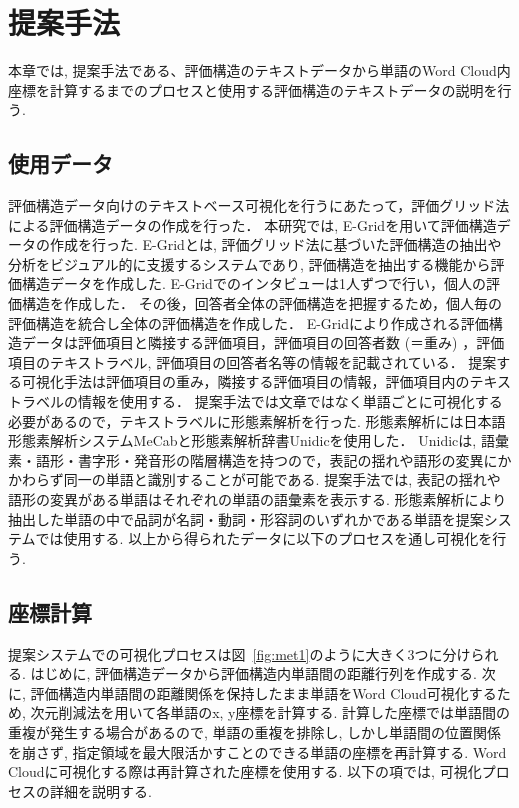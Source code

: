 \documentclass[syuuron]{kuee}
\begin{document}
\chapter{提案手法}
	本章では, 提案手法である、評価構造のテキストデータから単語のWord Cloud内座標を計算するまでのプロセスと使用する評価構造のテキストデータの説明を行う. 
	
	\section{使用データ}
		評価構造データ向けのテキストベース可視化を行うにあたって，評価グリッド法による評価構造データの作成を行った．
		本研究では, E-Gridを用いて評価構造データの作成を行った. 
		E-Gridとは, 評価グリッド法に基づいた評価構造の抽出や分析をビジュアル的に支援するシステムであり, 
		評価構造を抽出する機能から評価構造データを作成した. 
		E-Gridでのインタビューは1人ずつで行い，個人の評価構造を作成した．
		その後，回答者全体の評価構造を把握するため，個人毎の評価構造を統合し全体の評価構造を作成した．
		E-Gridにより作成される評価構造データは評価項目と隣接する評価項目，評価項目の回答者数 (＝重み) ，評価項目のテキストラベル, 評価項目の回答者名等の情報を記載されている．
		提案する可視化手法は評価項目の重み，隣接する評価項目の情報，評価項目内のテキストラベルの情報を使用する．
		提案手法では文章ではなく単語ごとに可視化する必要があるので，テキストラベルに形態素解析を行った. 
		形態素解析には日本語形態素解析システムMeCab\cite{mcb1}と形態素解析辞書Unidicを使用した．
		Unidicは, 語彙素・語形・書字形・発音形の階層構造を持つので，表記の揺れや語形の変異にかかわらず同一の単語と識別することが可能である. 
		提案手法では, 表記の揺れや語形の変異がある単語はそれぞれの単語の語彙素を表示する. 
		形態素解析により抽出した単語の中で品詞が名詞・動詞・形容詞のいずれかである単語を提案システムでは使用する. 
		以上から得られたデータに以下のプロセスを通し可視化を行う. 
		
	\section{座標計算}
		提案システムでの可視化プロセスは図~\ref{fig:met1}のように大きく3つに分けられる. 
		はじめに, 評価構造データから評価構造内単語間の距離行列を作成する. 
		次に, 評価構造内単語間の距離関係を保持したまま単語をWord Cloud可視化するため, 次元削減法を用いて各単語のx, y座標を計算する. 
		計算した座標では単語間の重複が発生する場合があるので, 
		単語の重複を排除し, しかし単語間の位置関係を崩さず, 指定領域を最大限活かすことのできる単語の座標を再計算する. 
		Word Cloudに可視化する際は再計算された座標を使用する. 
		以下の項では, 可視化プロセスの詳細を説明する. 
		
\end{document}
